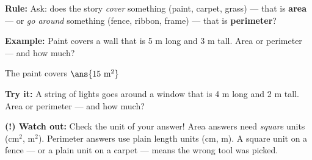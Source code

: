 \documentclass[12pt]{article}
\begin{document}
\begin{formulabox}
\textbf{Rule:} Ask: does the story \emph{cover} something (paint, carpet,
grass) --- that is \textbf{area} --- or \emph{go around} something (fence,
ribbon, frame) --- that is \textbf{perimeter}?
\end{formulabox}

\begin{examplebox}
\textbf{Example:} Paint covers a wall that is 5 m long and 3 m tall. Area or
perimeter --- and how much?

The paint covers $\ans{15\ \text{m}^2}$
\end{examplebox}

\begin{tryitbox}
\textbf{Try it:} A string of lights goes around a window that is 4 m long and
2 m tall. Area or perimeter --- and how much?\\[2pt]
\end{tryitbox}

\begin{watchoutbox}
\textbf{(!) Watch out:} Check the unit of your answer! Area answers need
\emph{square} units (cm$^2$, m$^2$). Perimeter answers use plain length units
(cm, m). A square unit on a fence --- or a plain unit on a carpet --- means
the wrong tool was picked.
\end{watchoutbox}
\end{document}
